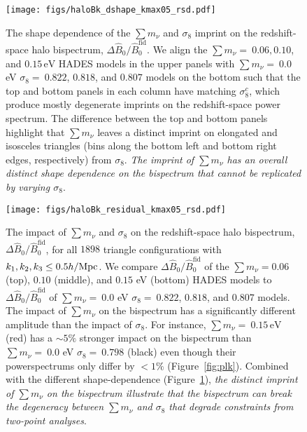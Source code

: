 \documentclass[12pt, letterpaper, preprint]{aastex62}
\newcommand{\smnu}{\sum m_\nu}
\newcommand{\sig}{\sigma_8}
\newcommand{\BOk}{\widehat{B}_0}
\begin{document}
\begin{figure}
\begin{center}
\texttt{[image: figs/haloBk\_dshape\_kmax05\_rsd.pdf]} 
    \caption{The shape dependence of the $\smnu$ and $\sig$ imprint on 
    the redshift-space halo bispectrum, $\Delta \BOk/\BOk^\mathrm{fid}$. 
    We align the $\smnu{=}~0.06, 0.10$, and $0.15\,\mathrm{eV}$ HADES models 
    in the upper panels with $\smnu{=}~0.0$ eV $\sig{=}~0.822$, $0.818$, and $0.807$ 
    models on the bottom such that the top and bottom panels in each column 
    have matching $\sig^{c}$, which produce mostly degenerate imprints on the 
    redshift-space power spectrum. The difference between the top and bottom 
    panels highlight that $\smnu$ leaves a distinct imprint on elongated and 
    isosceles triangles (bins along the bottom left and bottom right edges, 
    respectively) from $\sig$. {\em The imprint of $\smnu$ has an overall 
    distinct shape dependence on the bispectrum that cannot be replicated by 
    varying $\sig$}. 
    }
\label{fig:dbk_shape}
\end{center}
\end{figure}

\begin{figure}
\begin{center}
\texttt{[image: figs/haloBk\_residual\_kmax05\_rsd.pdf]}
    \caption{The impact of $\smnu$ and $\sig$ on the redshift-space halo bispectrum,
    $\Delta \BOk/\BOk^\mathrm{fid}$, for all $1898$ triangle configurations with 
    $k_1, k_2, k_3 \leq 0.5 h/{\rm Mpc}$. We compare $\Delta \BOk/\BOk^\mathrm{fid}$ 
    of the $\smnu = 0.06$ (top), $0.10$ (middle), and $0.15$ eV (bottom) HADES models
    to $\Delta \BOk/\BOk^\mathrm{fid}$ of $\smnu{=}~0.0$ eV $\sig{=}~0.822$, $0.818$, and 
    $0.807$ models. The impact of $\smnu$ on the bispectrum has a significantly different 
    amplitude than the impact of $\sig$. For instance, $\smnu{=}~0.15\,\mathrm{eV}$ (red) 
    has a $\sim 5\%$ stronger impact on the bispectrum than $\smnu{=}~0.0$ eV  
    $\sig{=}~0.798$ (black) even though their powerspectrums only differ by $< 1\%$ 
    (Figure~\ref{fig:plk}). Combined with the different shape-dependence (Figure~\ref{fig:dbk_shape}), 
    {\em the distinct imprint of $\smnu$ on the bispectrum illustrate that the bispectrum 
    can break the degeneracy between $\smnu$ and $\sig$ 
    that degrade constraints from two-point analyses}.
    }
\label{fig:dbk_amp}
\end{center}
\end{figure}
\end{document}

